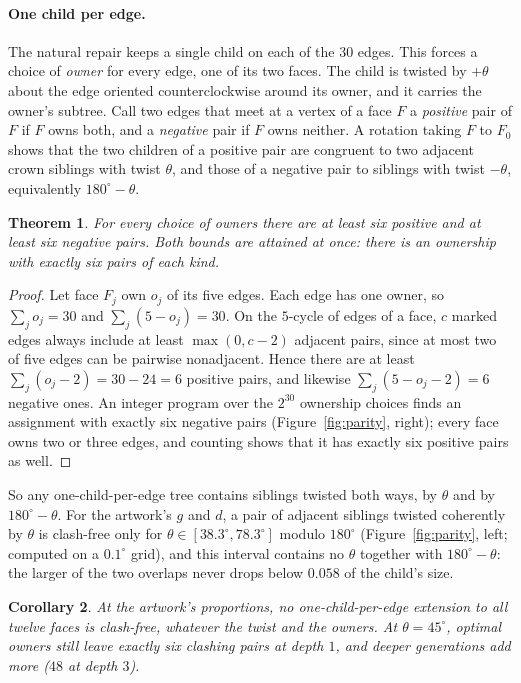 \documentclass[12pt]{article}
\theoremstyle{plain}
\newtheorem{theorem}{Theorem}
\newtheorem{corollary}[theorem]{Corollary}
\theoremstyle{remark}
\begin{document}
\paragraph{One child per edge.}  The natural repair keeps a single child on
each of the $30$ edges.  This forces a choice of \emph{owner} for every edge,
one of its two faces.  The child is twisted by $+\theta$ about the edge
oriented counterclockwise around its owner, and it carries the owner's
subtree.  Call two edges that meet at a vertex of a face $F$ a
\emph{positive} pair of $F$ if $F$ owns both, and a \emph{negative} pair if
$F$ owns neither.  A rotation taking $F$ to $F_0$ shows that the two children
of a positive pair are congruent to two adjacent crown siblings with twist
$\theta$, and those of a negative pair to siblings with twist $-\theta$,
equivalently $180^\circ-\theta$.

\begin{theorem}\label{thm:parity}
For every choice of owners there are at least six positive and at least six
negative pairs.  Both bounds are attained at once: there is an ownership with
exactly six pairs of each kind.
\end{theorem}

\begin{proof}
Let face $F_j$ own $o_j$ of its five edges.  Each edge has one owner, so
$\sum_j o_j=30$ and $\sum_j(5-o_j)=30$.  On the $5$-cycle of edges of a face,
$c$ marked edges always include at least $\max(0,c-2)$ adjacent pairs, since
at most two of five edges can be pairwise nonadjacent.  Hence there are at
least $\sum_j(o_j-2)=30-24=6$ positive pairs, and likewise
$\sum_j(5-o_j-2)=6$ negative ones.  An integer program over the $2^{30}$
ownership choices finds an assignment with exactly six negative pairs
(Figure~\ref{fig:parity}, right); every face owns two or three edges, and
counting shows that it has exactly six positive pairs as well.
\end{proof}

So any one-child-per-edge tree contains siblings twisted both ways, by
$\theta$ and by $180^\circ-\theta$.  For the artwork's $g$ and $d$, a pair of
adjacent siblings twisted coherently by $\theta$ is clash-free only for
$\theta\in[38.3^\circ,78.3^\circ]$ modulo $180^\circ$ (Figure~\ref{fig:parity},
left; computed on a $0.1^\circ$ grid), and this interval contains no $\theta$
together with $180^\circ-\theta$: the larger of the two overlaps never drops
below $0.058$ of the child's size.

\begin{corollary}
At the artwork's proportions, no one-child-per-edge extension to all twelve
faces is clash-free, whatever the twist and the owners.  At $\theta=45^\circ$,
optimal owners still leave exactly six clashing pairs at depth $1$, and deeper
generations add more ($48$ at depth $3$).
\end{corollary}
\end{document}

